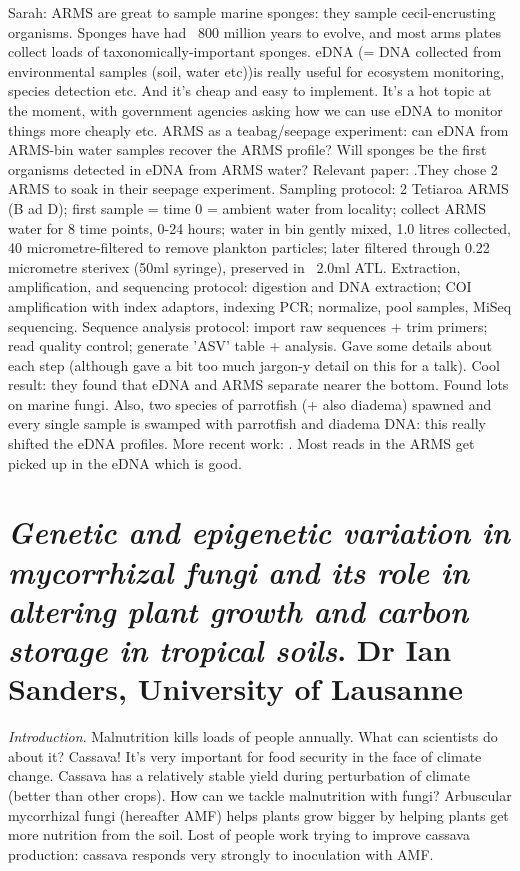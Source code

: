 \documentclass[9pt]{article}
\begin{document}
	Sarah: ARMS are great to sample marine sponges: they sample cecil-encrusting organisms. Sponges have had ~800 million years to evolve, and most arms plates collect loads of taxonomically-important sponges. eDNA (= DNA collected from environmental samples (soil, water etc))is really useful for ecosystem monitoring, species detection etc. And it's cheap and easy to implement. It's a hot topic at the moment, with government agencies asking how we can use eDNA to monitor things more cheaply etc. ARMS as a teabag/seepage experiment: can eDNA from ARMS-bin water samples recover the ARMS profile? Will sponges be the first organisms detected in eDNA from ARMS water? Relevant paper: \cite{de2009cell}.They chose 2 ARMS to soak in their seepage experiment. Sampling protocol: 2 Tetiaroa ARMS (B ad D); first sample = time 0 = ambient water from locality; collect ARMS water for 8 time points, 0-24 hours; water in bin gently mixed, 1.0 litres collected, 40 micrometre-filtered to remove plankton particles; later filtered through 0.22 micrometre sterivex (50ml syringe), preserved in ~2.0ml ATL. Extraction, amplification, and sequencing protocol: digestion and DNA extraction; COI amplification with index adaptors, indexing PCR; normalize, pool samples, MiSeq sequencing. Sequence analysis protocol: import raw sequences + trim primers; read quality control; generate 'ASV' table + analysis. Gave some details about each step (although gave a bit too much jargon-y detail on this for a talk). Cool result: they found that eDNA and ARMS separate nearer the bottom. Found lots on marine fungi. Also, two species of parrotfish (+ also diadema) spawned and every single sample is swamped with parrotfish and diadema DNA: this really shifted the eDNA profiles. More recent work: \cite{antich2021marine}. Most reads in the ARMS get picked up in the eDNA which is good. 
	
	
	
	\section{\textit{Genetic and epigenetic variation in mycorrhizal fungi and its role in altering plant growth and carbon storage in tropical soils}. Dr Ian Sanders, University of Lausanne}
	
	\textit{Introduction}. Malnutrition kills loads of people annually. What can scientists do about it? Cassava! It's very important for food security in the face of climate change. Cassava has a relatively stable yield during perturbation of climate (better than other crops). How can we tackle malnutrition with fungi? Arbuscular mycorrhizal fungi (hereafter AMF) helps plants grow bigger by helping plants get more nutrition from the soil. Lost of people work trying to improve cassava production: cassava responds very strongly to inoculation with AMF. 
	
\end{document}
